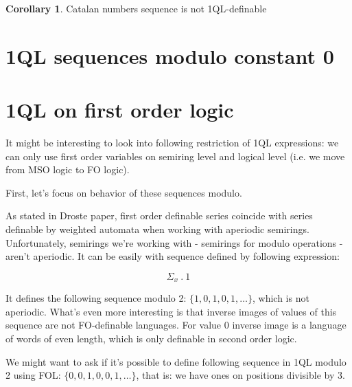 \documentclass[12pt]{article}
\theoremstyle{definition}
\newtheorem{corollary}{Corollary}[section]
\begin{document}
\begin{corollary}
    Catalan numbers sequence is not 1QL-definable
\end{corollary}

\section{1QL sequences modulo constant 0}

\section{1QL on first order logic}
It might be interesting to look into following restriction of 1QL expressions: we can only use first order variables on semiring level and logical level (i.e. we move from MSO logic to FO logic). 

First, let's focus on behavior of these sequences modulo.

As stated in Droste paper, first order definable series coincide with series definable by weighted automata when working with aperiodic semirings. Unfortunately, semirings we're working with - semirings for modulo operations - aren't aperiodic. It can be easily with sequence defined by following expression:

$$ \Sigma_x \ . \ 1 $$

It defines the following sequence modulo 2: $\{1, 0, 1, 0, 1, \ldots\}$, which is not aperiodic. What's even more interesting is that inverse images of values of this sequence are not FO-definable languages. For value $0$ inverse image is a language of words of even length, which is only definable in second order logic. 

We might want to ask if it's possible to define following sequence in 1QL modulo 2 using FOL: $\{0, 0, 1, 0, 0, 1, \ldots\}$, that is: we have ones on positions divisible by 3. 
\end{document}
